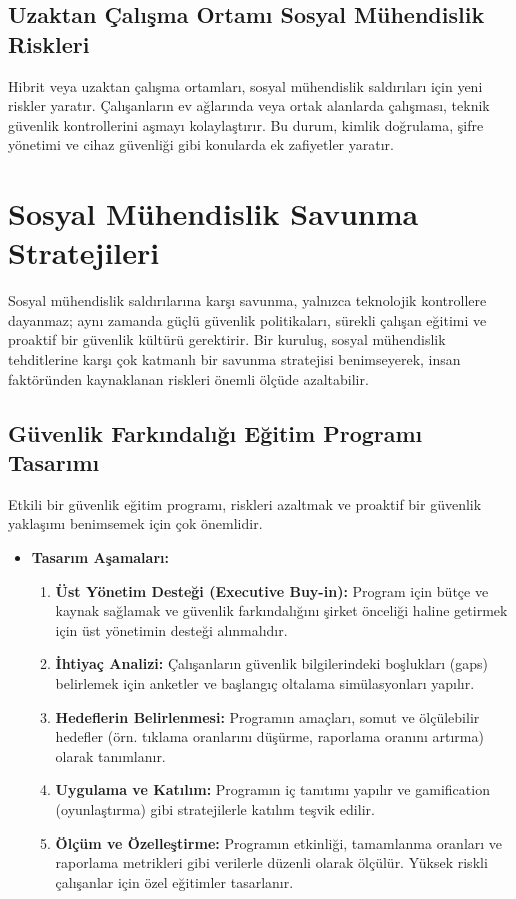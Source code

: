 \subsection{Uzaktan Çalışma Ortamı Sosyal Mühendislik Riskleri}

Hibrit veya uzaktan çalışma ortamları, sosyal mühendislik saldırıları için yeni riskler yaratır. Çalışanların ev ağlarında veya ortak alanlarda çalışması, teknik güvenlik kontrollerini aşmayı kolaylaştırır. Bu durum, kimlik doğrulama, şifre yönetimi ve cihaz güvenliği gibi konularda ek zafiyetler yaratır.

\section{Sosyal Mühendislik Savunma Stratejileri}

Sosyal mühendislik saldırılarına karşı savunma, yalnızca teknolojik kontrollere dayanmaz; aynı zamanda güçlü güvenlik politikaları, sürekli çalışan eğitimi ve proaktif bir güvenlik kültürü gerektirir. Bir kuruluş, sosyal mühendislik tehditlerine karşı çok katmanlı bir savunma stratejisi benimseyerek, insan faktöründen kaynaklanan riskleri önemli ölçüde azaltabilir.

\subsection{Güvenlik Farkındalığı Eğitim Programı Tasarımı}

Etkili bir güvenlik eğitim programı, riskleri azaltmak ve proaktif bir güvenlik yaklaşımı benimsemek için çok önemlidir.

\begin{itemize}
    \item \textbf{Tasarım Aşamaları:}
    \begin{enumerate}
        \item \textbf{Üst Yönetim Desteği (Executive Buy-in):} Program için bütçe ve kaynak sağlamak ve güvenlik farkındalığını şirket önceliği haline getirmek için üst yönetimin desteği alınmalıdır.
        \item \textbf{İhtiyaç Analizi:} Çalışanların güvenlik bilgilerindeki boşlukları (gaps) belirlemek için anketler ve başlangıç oltalama simülasyonları yapılır.
        \item \textbf{Hedeflerin Belirlenmesi:} Programın amaçları, somut ve ölçülebilir hedefler (örn. tıklama oranlarını düşürme, raporlama oranını artırma) olarak tanımlanır.
        \item \textbf{Uygulama ve Katılım:} Programın iç tanıtımı yapılır ve gamification (oyunlaştırma) gibi stratejilerle katılım teşvik edilir.
        \item \textbf{Ölçüm ve Özelleştirme:} Programın etkinliği, tamamlanma oranları ve raporlama metrikleri gibi verilerle düzenli olarak ölçülür. Yüksek riskli çalışanlar için özel eğitimler tasarlanır.
    \end{enumerate}
\end{itemize}

